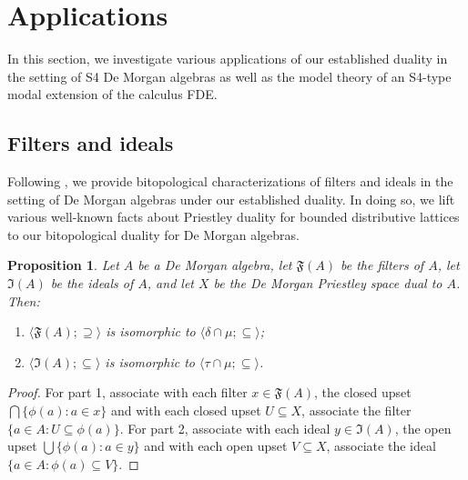 \documentclass{amsart}
\theoremstyle{plain}
\newtheorem{proposition}[theorem]{Proposition}
\theoremstyle{definition}
\begin{document}
\section{Applications} \label{sec:applications}
In this section, we investigate various applications of our established duality in the setting of S4 De Morgan algebras as well as the model theory of an S4-type modal extension of the calculus FDE. 


\subsection{Filters and ideals} Following \cite{bezhanishvili}, we provide bitopological characterizations of filters and ideals in the setting of De Morgan algebras under our established duality. In doing so, we lift various well-known facts about Priestley duality for bounded distributive lattices to our bitopological duality for De Morgan algebras.  


  
 


\begin{proposition}\label{proposition 5.1}
    Let $A$ be a De Morgan algebra, let $\mathfrak{F}(A)$ be the filters of $A$, let $\mathfrak{I}(A)$ be the ideals of $A$, and let $X$ be the De Morgan Priestley space dual to $A$. Then:
    \begin{enumerate}
        \item $\langle\mathfrak{F}(A);\supseteq\rangle$ is isomorphic to  $\langle\delta\cap\mu;\subseteq\rangle$; 
        \item $\langle\mathfrak{I}(A);\subseteq\rangle$ is isomorphic to $\langle\tau\cap\mu;\subseteq\rangle$. 
    \end{enumerate}   
\end{proposition}
\begin{proof}
    For part 1, associate with each filter $x\in\mathfrak{F}(A)$, the closed upset $\bigcap\{\phi(a):a\in x\}$ and with each closed upset $U\subseteq X$, associate the filter $\{a\in A:U\subseteq\phi(a)\}$. For part 2, associate with each ideal $y\in\mathfrak{I}(A)$, the open upset $\bigcup\{\phi(a):a\in y\}$ and with each open upset $V\subseteq X$, associate the ideal $\{a\in A:\phi(a)\subseteq V\}$.   
\end{proof}
\end{document}
